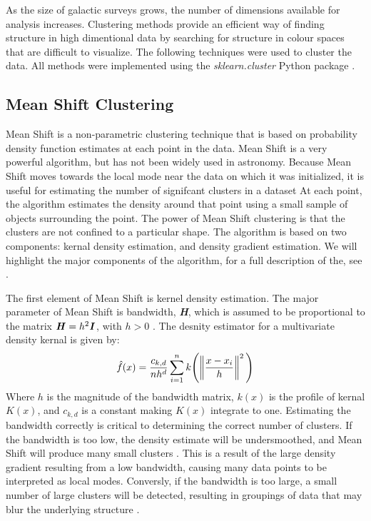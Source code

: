 As the size of galactic surveys grows, the number of dimensions available for analysis increases.
Clustering methods provide an efficient way of finding structure in high dimentional data by searching for structure in colour spaces that are difficult to visualize. 
The following techniques were used to cluster the data.
All methods were implemented using the \textit{sklearn.cluster} Python package \citep{sklearn}.

\subsection{Mean Shift Clustering} 
Mean Shift is a non-parametric clustering technique that is based on probability density function estimates at each point in the data. %
Mean Shift is a very powerful algorithm, but has not been widely used in astronomy. %
Because Mean Shift moves towards the local mode near the data on which it was initialized, it is useful for estimating the number of signifcant clusters in a dataset \citet{comanciciu02}
At each point, the algorithm estimates the density around that point using a small sample of objects surrounding the point.
The power of Mean Shift clustering is that the clusters are not confined to a particular shape.
The algorithm is based on two components: kernal density estimation, and density gradient estimation.
We will highlight the major components of the algorithm, for a full description of the, see \citet{vatturi09}.

The first element of Mean Shift is kernel density estimation. 
The major parameter of Mean Shift is bandwidth, \textbf{\textit{H}}, which is assumed to be proportional to the matrix $\textbf{\textit{H}} = h^2\textbf{\textit{I}}$, with $h>0$ \citet{vatturi09}.
The desnity estimator for a multivariate density kernal is given by: 
\begin{equation} 
\label{eq:ms_de}
\hat{f}(x) = \frac{c_{k,d}}{nh^d} \sum_{i=1}^n k\Bigg( \norm{\frac{x-x_{i}}{h}}^2 \Bigg)
\end{equation}
Where $h$ is the magnitude of the bandwidth matrix, $k(x)$ is the profile of kernal $K(x)$, and $c_{k,d}$ is a constant making $K(x)$ integrate to one\citet{vatturi09}.
Estimating the bandwidth correctly is critical to determining the correct number of clusters.
If the bandwidth is too low, the density estimate will be undersmoothed, and Mean Shift will produce many small clusters \citet{vatturi09}. This is a result of the large density gradient resulting from a low bandwidth, causing many data points to be interpreted as local modes.
Conversly, if the bandwidth is too large, a small number of large clusters will be detected, resulting in groupings of data that may blur the underlying structure \citet{vatturi09}.

